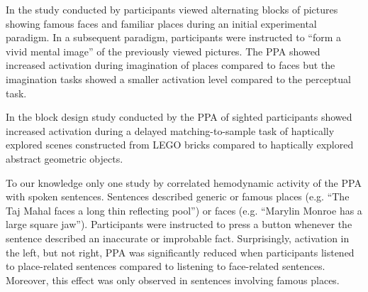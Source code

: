 \documentclass[english]{article}
\begin{document}
In the study conducted by \citep{ocraven2000mental} participants viewed alternating blocks of pictures showing famous faces and familiar places during an initial experimental paradigm.
In a subsequent paradigm, participants were instructed to ``form a vivid mental image'' of the previously viewed pictures.
The PPA showed increased activation during imagination of places compared to faces but the imagination tasks showed a smaller activation level compared to the perceptual task.

In the block design study conducted by \citep{wolbers2011modality} the PPA of sighted participants showed increased activation during a delayed matching-to-sample task of haptically explored scenes constructed from LEGO bricks compared to haptically explored abstract geometric objects.

To our knowledge only one study by \citep{aziz2008modulation} correlated hemodynamic activity of the PPA with spoken sentences. Sentences described generic or famous places (e.g. ``The Taj Mahal faces a long thin reflecting pool'') or faces  (e.g. ``Marylin Monroe has a large square jaw''). Participants were instructed to press a button whenever the sentence described an inaccurate or improbable fact. Surprisingly, activation in the left, but not right, PPA was significantly reduced when participants listened to place-related sentences compared to listening to face-related sentences. Moreover, this effect was only observed in sentences involving famous places.
\end{document}
